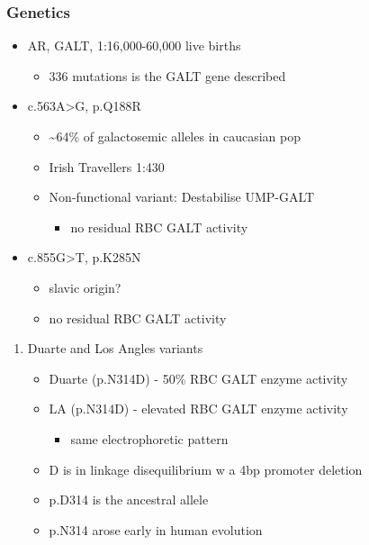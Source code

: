 \documentclass{scrartcl}
\begin{document}
\subsubsection{Genetics}
\label{sec:orge28287a}
\begin{itemize}
\item AR, GALT, 1:16,000-60,000 live births
\begin{itemize}
\item 336 mutations is the GALT gene described
\end{itemize}
\item c.563A>G, p.Q188R
\begin{itemize}
\item \textasciitilde{}64\% of galactosemic alleles in caucasian pop
\item Irish Travellers 1:430
\item Non-functional variant: Destabilise UMP-GALT
\begin{itemize}
\item no residual RBC GALT activity
\end{itemize}
\end{itemize}
\item c.855G>T, p.K285N
\begin{itemize}
\item slavic origin?
\item no residual RBC GALT activity
\end{itemize}
\end{itemize}
\begin{enumerate}
\item Duarte and Los Angles variants
\label{sec:org1e7f1ee}
\begin{itemize}
\item Duarte (p.N314D) - 50\% RBC GALT enzyme activity
\item LA (p.N314D) - elevated RBC GALT enzyme activity
\begin{itemize}
\item same electrophoretic pattern
\end{itemize}
\item D is in linkage disequilibrium w a 4bp promoter deletion
\item p.D314 is the ancestral allele
\item p.N314 arose early in human evolution
\end{itemize}
\end{enumerate}
\end{document}
